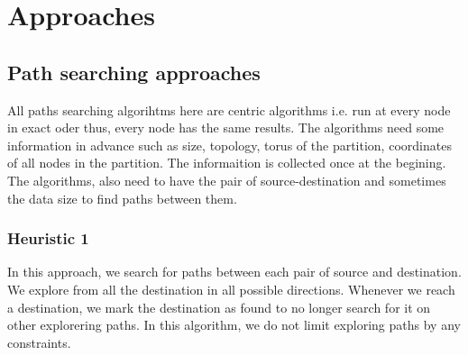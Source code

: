 \section{Approaches}
\label{sec:approach}

\subsection{Path searching approaches}
All paths searching algorihtms here are centric algorithms i.e. run at every node in exact oder thus, every node has the same results. The algorithms need some information in advance such as size, topology, torus of the partition, coordinates of all nodes in the partition. The informaition is collected once at the begining. The algorithms, also need to have the pair of source-destination and sometimes the data size to find paths between them.

\subsubsection{Heuristic 1}
In this approach, we search for paths between each pair of source and destination. We explore from all the destination in all possible directions. Whenever we reach a destination, we mark the destination as found to no longer search for it on other explorering paths. In this algorithm, we do not limit exploring paths by any constraints.

